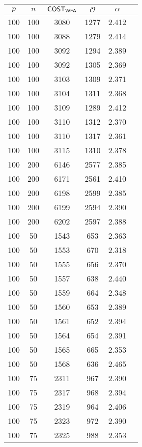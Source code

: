 \begin{table}[!ht]
\parbox{.45\linewidth}{
\centering
\begin{tabular}{|c|c|c|c|c|c|}
\hline
$p$ & $n$ & $\sf{COST}_{\sf{WFA}}$ & $\mathcal{O}$ & $\alpha$ \\
\hline
100 & 100 & 3080 & 1277	& 2.412     \\
100 & 100 & 3088 & 1279	& 2.414     \\
100 & 100 & 3092 & 1294	& 2.389     \\
100 & 100 & 3092 & 1305	& 2.369     \\
100 & 100 & 3103 & 1309	& 2.371     \\
100 & 100 & 3104 & 1311	& 2.368     \\
100 & 100 & 3109 & 1289	& 2.412     \\
100 & 100 & 3110 & 1312	& 2.370     \\
100 & 100 & 3110 & 1317	& 2.361     \\
100 & 100 & 3115 & 1310	& 2.378     \\
100 & 200 & 6146 & 2577	& 2.385     \\
100 & 200 & 6171 & 2561	& 2.410     \\
100 & 200 & 6198 & 2599	& 2.385     \\
100 & 200 & 6199 & 2594	& 2.390     \\
100 & 200 & 6202 & 2597	& 2.388     \\
100 & 50  & 1543 & 653	& 2.363      \\
100 & 50  & 1553 & 670	& 2.318      \\
100 & 50  & 1555 & 656	& 2.370      \\
100 & 50  & 1557 & 638	& 2.440      \\
100 & 50  & 1559 & 664	& 2.348      \\
100 & 50  & 1560 & 653	& 2.389      \\
100 & 50  & 1561 & 652	& 2.394      \\
100 & 50  & 1564 & 654	& 2.391      \\
100 & 50  & 1565 & 665	& 2.353      \\
100 & 50  & 1568 & 636	& 2.465      \\
100 & 75  & 2311 & 967	& 2.390      \\
100 & 75  & 2317 & 968	& 2.394      \\
100 & 75  & 2319 & 964	& 2.406      \\
100 & 75  & 2323 & 972	& 2.390      \\
100 & 75  & 2325 & 988	& 2.353      \\

\end{tabular}}
\end{table}
